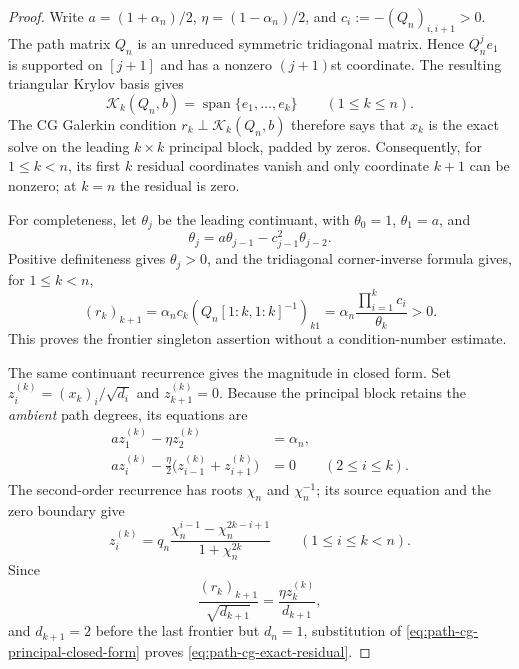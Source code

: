 \documentclass[11pt]{article}
\begin{document}
\begin{proof}
Write $a=(1+\alpha_n)/2$, $\eta=(1-\alpha_n)/2$, and
$c_i:=-(Q_n)_{i,i+1}>0$.  The path matrix $Q_n$ is an unreduced symmetric
tridiagonal matrix.  Hence $Q_n^j e_1$ is supported on $[j+1]$ and has a
nonzero $(j+1)$st coordinate.  The resulting triangular Krylov basis gives
\begin{equation*}
 \mathcal K_k(Q_n,b)=\operatorname{span}\{e_1,\ldots,e_k\}
 \qquad(1\leq k\leq n).
\end{equation*}
The CG Galerkin condition $r_k\perp\mathcal K_k(Q_n,b)$ therefore says that
$x_k$ is the exact solve on the leading $k\times k$ principal block, padded
by zeros.  Consequently, for $1\leq k<n$, its first $k$ residual coordinates
vanish and only coordinate $k+1$ can be nonzero; at $k=n$ the residual is
zero.

For completeness, let $\theta_j$ be the leading continuant, with
$\theta_0=1$, $\theta_1=a$, and
\begin{equation*}
 \theta_j=a\theta_{j-1}-c_{j-1}^2\theta_{j-2}.
\end{equation*}
Positive definiteness gives $\theta_j>0$, and the tridiagonal corner-inverse
formula gives, for $1\leq k<n$,
\begin{equation*}
 (r_k)_{k+1}
 =\alpha_n c_k(Q_n[1\!:\!k,1\!:\!k]^{-1})_{k1}
 =\alpha_n\frac{\prod_{i=1}^k c_i}{\theta_k}>0.
\end{equation*}
This proves the frontier singleton assertion without a condition-number
estimate.

The same continuant recurrence gives the magnitude in closed form.  Set
$z_i^{(k)}=(x_k)_i/\sqrt{d_i}$ and $z_{k+1}^{(k)}=0$.  Because the principal
block retains the \emph{ambient} path degrees, its equations are
\begin{align*}
 a z_1^{(k)}-\eta z_2^{(k)}&=\alpha_n,\\
 a z_i^{(k)}-\frac{\eta}{2}
   \bigl(z_{i-1}^{(k)}+z_{i+1}^{(k)}\bigr)&=0
   \qquad(2\leq i\leq k).
\end{align*}
The second-order recurrence has roots $\chi_n$ and $\chi_n^{-1}$; its source
equation and the zero boundary give
\begin{equation}
 z_i^{(k)}
 =q_n\frac{\chi_n^{i-1}-\chi_n^{2k-i+1}}
              {1+\chi_n^{2k}}
 \qquad(1\leq i\leq k<n).
 \label{eq:path-cg-principal-closed-form}
\end{equation}
Since
\begin{equation*}
 \frac{(r_k)_{k+1}}{\sqrt{d_{k+1}}}
 =\frac{\eta z_k^{(k)}}{d_{k+1}},
\end{equation*}
and $d_{k+1}=2$ before the last frontier but $d_n=1$, substitution of
\cref{eq:path-cg-principal-closed-form} proves
\cref{eq:path-cg-exact-residual}.


\end{proof}
\end{document}

